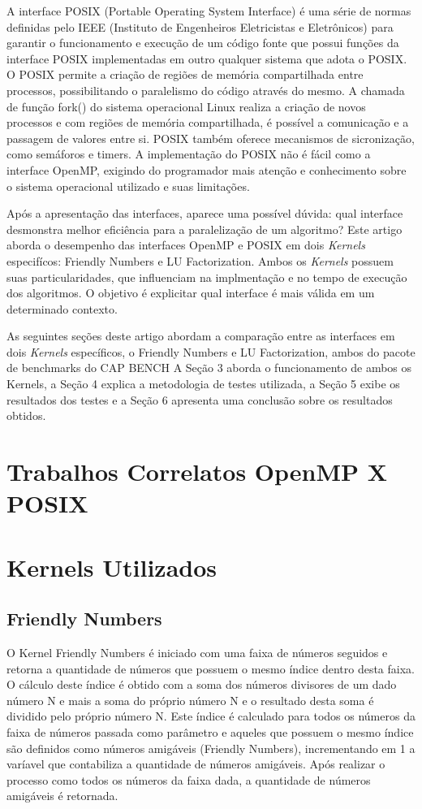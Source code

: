 \documentclass[12pt]{article}
\begin{document}
A interface POSIX (Portable Operating System Interface) é uma série de normas definidas pelo IEEE (Instituto de Engenheiros Eletricistas e Eletrônicos) para garantir o funcionamento e execução de um código fonte que possui funções da interface POSIX implementadas em outro qualquer sistema que adota o POSIX. O POSIX permite a criação de regiões de memória compartilhada entre processos, possibilitando o paralelismo do código através do mesmo. A chamada de função fork() do sistema operacional Linux realiza a criação de novos processos e com regiões de memória compartilhada, é possível a comunicação e a passagem de valores entre si. POSIX também oferece mecanismos de sicronização, como semáforos e timers. A implementação do POSIX não é fácil como a interface OpenMP, exigindo do programador mais atenção e conhecimento sobre o sistema operacional utilizado e suas limitações.

Após a apresentação das interfaces, aparece uma possível dúvida: qual interface desmonstra melhor eficiência para a paralelização de um algoritmo? Este artigo aborda o desempenho das interfaces OpenMP e POSIX em dois \textit{Kernels} especifícos: Friendly Numbers e LU Factorization. Ambos os \textit{Kernels} possuem suas particularidades, que influenciam na implmentação e no tempo de execução dos algoritmos. O objetivo é explicitar qual interface é mais válida em um determinado contexto.

As seguintes seções deste artigo abordam a comparação entre as interfaces em dois \textit{Kernels} específicos, o Friendly Numbers e LU Factorization, ambos do pacote de benchmarks do CAP BENCH A Seção 3 aborda o funcionamento de ambos os Kernels, a Seção 4 explica a metodologia de testes utilizada, a Seção 5 exibe os resultados dos testes e a Seção 6 apresenta uma conclusão sobre os resultados obtidos. 


\section{Trabalhos Correlatos OpenMP X POSIX}

\section{Kernels Utilizados}
\subsection{Friendly Numbers}

O Kernel Friendly Numbers é iniciado com uma faixa de números seguidos e retorna a quantidade de números que possuem o mesmo índice dentro desta faixa. O cálculo deste índice é obtido com a soma dos números divisores de um dado número N e mais a soma do próprio número N e o resultado desta soma é dividido pelo próprio número N. Este índice é calculado para todos os números da faixa de números passada como parâmetro e aqueles que possuem o mesmo índice são definidos como números amigáveis (Friendly Numbers), incrementando em 1 a varíavel que contabiliza a quantidade de números amigáveis. Após realizar o processo como todos os números da faixa dada, a quantidade de números amigáveis é retornada. 
\end{document}
